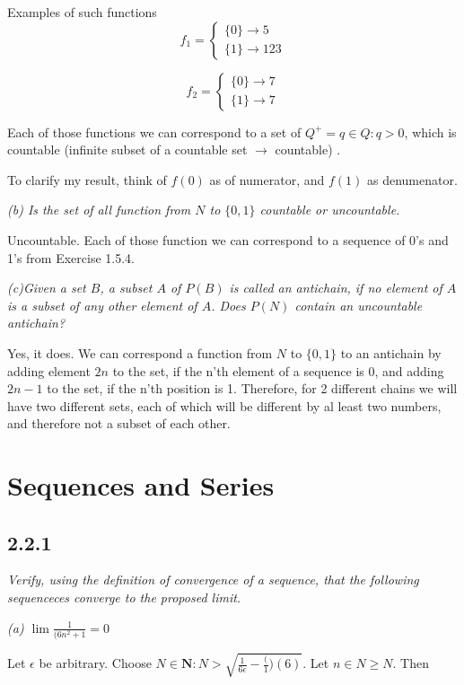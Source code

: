 \documentclass[11pt,oneside,titlepage]{book}
\begin{document}
Examples of such functions
\begin{equation}
  f_1 =
  \begin{cases}
    \{0\} \to 5 \\
    \{1\} \to 123
  \end{cases}
\end{equation}

\begin{equation}
  f_2 =
  \begin{cases}
    \{0\} \to 7 \\
    \{1\} \to 7
  \end{cases}
\end{equation}

Each of those functions we can correspond to a set of $Q^+ = {q \in Q: q > 0}$,
which is countable (infinite subset of a countable set $\to$ countable) .

To clarify my result, think of $f(0)$ as of numerator, and $f(1)$ as denumenator.

\textit{(b) Is the set of all function from $N$ to $\{0, 1\}$ countable or uncountable.}

Uncountable. Each of those function we can correspond to a sequence of 0's and 1's from
Exercise 1.5.4.

\textit{(c)Given a set $B$, a subset $A$ of $P(B)$ is called an antichain, if no
  element of $A$ is a subset of any other element of $A$. Does $P(N)$ contain an
  uncountable antichain?}

Yes, it does. We can correspond a function from $N$ to $\{0, 1\}$ to an antichain
by adding element $2n$ to the set, if the n'th element of a sequence is 0, and
adding $2n - 1$ to the set, if the n'th position is 1. Therefore, for
2 different chains we will have two different sets, each of which will be
different by al least two numbers, and therefore not a subset of each other.

\chapter{Sequences and Series}
\section*{2.2.1}
\textit{Verify, using the definition of convergence of a sequence, that the following
  sequenceces converge to the proposed limit.}

\textit{(a) $\lim\frac{1}{(6 n ^ 2 + 1} = 0$}

Let $\epsilon$ be arbitrary. Choose
$N \in \textbf{N}: N > \sqrt{\frac{1}{6 \epsilon} - \frac(1)(6)}$. Let $n \in N \geq N$. Then
\end{document}
